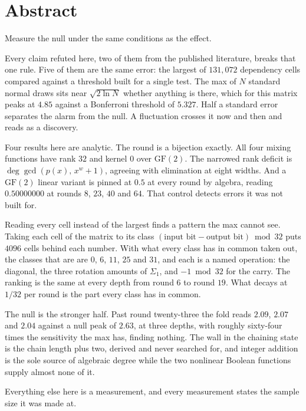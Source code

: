 \chapter*{Abstract}

Measure the null under the same conditions as the effect.

Every claim refuted here, two of them from the published literature, breaks that one rule.
Five of them are the same error: the largest of $131{,}072$ dependency cells compared against a
threshold built for a single test. The max of $N$ standard normal draws sits near
$\sqrt{2 \ln N}$ whether anything is there, which for this matrix peaks at $4.85$ against a
Bonferroni threshold of $5.327$. Half a standard error separates the alarm from the null.
A fluctuation crosses it now and then and reads as a discovery.

Four results here are analytic. The round is a bijection exactly. All four
mixing functions have rank $32$ and kernel $0$ over $\mathrm{GF}(2)$. The narrowed rank deficit is
$\deg \gcd(p(x),\, x^w + 1)$, agreeing with elimination at eight widths. And a $\mathrm{GF}(2)$
linear variant is pinned at $0.5$ at every round by algebra, reading $0.50000000$ at rounds $8$,
$23$, $40$ and $64$. That control detects errors it was not built for.

Reading every cell instead of the largest finds a pattern the max cannot see. Taking each cell
of the matrix to its class $(\text{input bit} - \text{output bit}) \bmod 32$ puts $4096$ cells
behind each number. With what every class has in common taken out, the classes that are are $0$,
$6$, $11$, $25$ and $31$, and each is a named operation: the diagonal, the three rotation amounts of
$\Sigma_1$, and $-1 \bmod 32$ for the carry. The ranking is the same at every depth from round $6$
to round $19$. What decays at $1/32$ per round is the part every class has in common.

The null is the stronger half. Past round twenty-three the fold reads $2.09$, $2.07$ and $2.04$
against a null peak of $2.63$, at three depths, with roughly sixty-four times the sensitivity the
max has, finding nothing. The wall in the chaining state is the chain length plus two, derived
and never searched for, and integer addition is the sole source of algebraic degree while the two
nonlinear Boolean functions supply almost none of it.

Everything else here is a measurement, and every measurement states the sample size it was
made at.
\cleardoublepage
